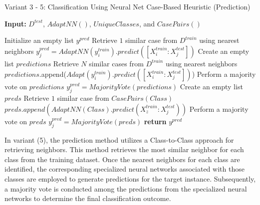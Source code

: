 \documentclass[a4paper, 12pt]{report}
\begin{document}
\begin{algorithm}
    \caption{Variant 3 - 5: Classification Using Neural Net Case-Based Heuristic (Prediction)}
    \label{alg:Classification_Varient3_5_using_CBH_predict_alg20}
    \textbf{Input:} $D^{test}$, $AdaptNN()$, $UniqueClasses$, and $CasePairs()$
    \begin{algorithmic}
        \State Initialize an empty list $y^{pred}$
                \State Retrieve $1$ similar case from $D^{train}$ using nearest neighbors
                    \State $y^{pred}_j = AdaptNN(y^{train}_i).predict([X^{train}_i:X^{test}_j])$
                \EndFor
            \Else
                    \State Create an empty list $predictions$
                    \State Retrieve $N$ similar cases from $D^{train}$ using nearest neighbors
                        \State $predictions$.append($Adapt(y^{train}_i).predict([X^{train}_i:X^{test}_j])$)
                    \EndFor
                    \State Perform a majority vote on $predictions$
                    \State $y^{pred}_j = MajorityVote(predictions)$
                \Else
                        \State Create an empty list $preds$
                            \State Retrieve $1$ similar case from $CasePairs(Class)$
                                    \State $preds.append(AdaptNN(Class).predict(X^{train}_z:X^{test}_j))$
                                \EndFor
                            \EndFor
                            \State Perform a majority vote on $preds$
                            \State $y^{pred}_j = MajorityVote(preds)$
                        \EndFor
                    \EndIf
                \EndIf
            \EndIf
        \EndFor
        \State \textbf{return} $y^{pred}$
    \end{algorithmic}
\end{algorithm}

In variant (5), the prediction method utilizes a Class-to-Class approach for retrieving neighbors. 
This method retrieves the most similar neighbor for each class from the training dataset. Once the nearest neighbors for each class are identified, the corresponding specialized neural networks associated with those classes are employed to generate predictions for the target instance. 
Subsequently, a majority vote is conducted among the predictions from the specialized neural networks to determine the final classification outcome.
\end{document}
